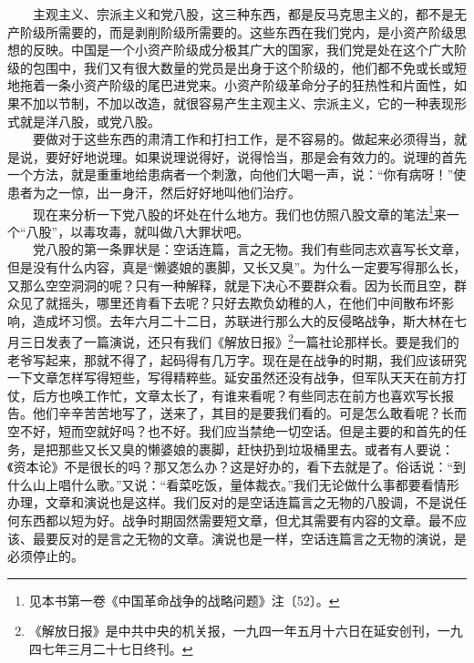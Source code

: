\documentclass[cn,11pt,chinese]{elegantbook}
\begin{document}
　　主观主义、宗派主义和党八股，这三种东西，都是反马克思主义的，都不是无产阶级所需要的，而是剥削阶级所需要的。这些东西在我们党内，是小资产阶级思想的反映。中国是一个小资产阶级成分极其广大的国家，我们党是处在这个广大阶级的包围中，我们又有很大数量的党员是出身于这个阶级的，他们都不免或长或短地拖着一条小资产阶级的尾巴进党来。小资产阶级革命分子的狂热性和片面性，如果不加以节制，不加以改造，就很容易产生主观主义、宗派主义，它的一种表现形式就是洋八股，或党八股。\\
　　要做对于这些东西的肃清工作和打扫工作，是不容易的。做起来必须得当，就是说，要好好地说理。如果说理说得好，说得恰当，那是会有效力的。说理的首先一个方法，就是重重地给患病者一个刺激，向他们大喝一声，说：“你有病呀！”使患者为之一惊，出一身汗，然后好好地叫他们治疗。\\
　　现在来分析一下党八股的坏处在什么地方。我们也仿照八股文章的笔法\footnote[5]{ 见本书第一卷《中国革命战争的战略问题》注〔52〕。}来一个“八股”，以毒攻毒，就叫做八大罪状吧。\\
　　党八股的第一条罪状是：空话连篇，言之无物。我们有些同志欢喜写长文章，但是没有什么内容，真是“懒婆娘的裹脚，又长又臭”。为什么一定要写得那么长，又那么空空洞洞的呢？只有一种解释，就是下决心不要群众看。因为长而且空，群众见了就摇头，哪里还肯看下去呢？只好去欺负幼稚的人，在他们中间散布坏影响，造成坏习惯。去年六月二十二日，苏联进行那么大的反侵略战争，斯大林在七月三日发表了一篇演说，还只有我们《解放日报》\footnote[6]{ 《解放日报》是中共中央的机关报，一九四一年五月十六日在延安创刊，一九四七年三月二十七日终刊。}一篇社论那样长。要是我们的老爷写起来，那就不得了，起码得有几万字。现在是在战争的时期，我们应该研究一下文章怎样写得短些，写得精粹些。延安虽然还没有战争，但军队天天在前方打仗，后方也唤工作忙，文章太长了，有谁来看呢？有些同志在前方也喜欢写长报告。他们辛辛苦苦地写了，送来了，其目的是要我们看的。可是怎么敢看呢？长而空不好，短而空就好吗？也不好。我们应当禁绝一切空话。但是主要的和首先的任务，是把那些又长又臭的懒婆娘的裹脚，赶快扔到垃圾桶里去。或者有人要说：《资本论》不是很长的吗？那又怎么办？这是好办的，看下去就是了。俗话说：“到什么山上唱什么歌。”又说：“看菜吃饭，量体裁衣。”我们无论做什么事都要看情形办理，文章和演说也是这样。我们反对的是空话连篇言之无物的八股调，不是说任何东西都以短为好。战争时期固然需要短文章，但尤其需要有内容的文章。最不应该、最要反对的是言之无物的文章。演说也是一样，空话连篇言之无物的演说，是必须停止的。\\
\end{document}
